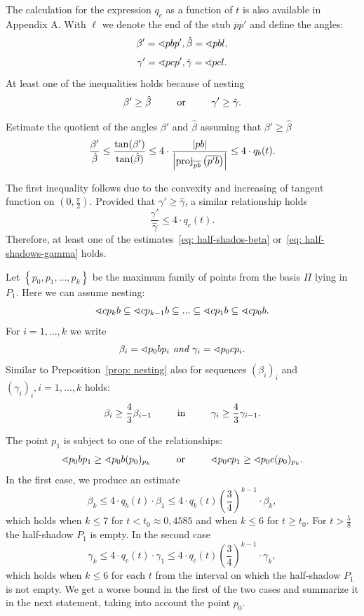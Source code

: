 The calculation for the expression $q_{c}$ as a function of $t$ is also available in Appendix A. With $\ell$ we denote the end of the stub $\overline{p}p'$ and define the angles:
$$
\beta' = \sphericalangle{pbp'}, \hat{\beta} = \sphericalangle{pbl},
$$
$$
\gamma' = \sphericalangle{pcp'}, \hat{\gamma} = \sphericalangle{pcl}.
$$
At least one of the inequalities holds because of nesting
$$
\beta' \geq \hat{\beta} \text{\hspace{0.8cm}   or   \hspace{0.8cm}} \gamma' \geq \hat{\gamma}.
$$

Estimate the quotient of the angles $\beta'$ and $\hat{\beta}$ assuming that $\beta' \geq \hat{\beta}$
\begin{equation}
\label{eq: half-shados-beta}
\frac{\beta'}{\hat{\beta}} \leq \frac{\tan(\beta')}{\tan(\hat{\beta})} \leq 4\cdot\frac{\left|pb\right|}{\left|\operatorname{proj}_{\overline{pb}} \left(\overline{p'b}\right) \right|} \leq 4 \cdot q_{b}(t).
\end{equation}

The first inequality follows due to the convexity and increasing of tangent function on $(0,\frac{\pi}{2})$. Provided that $\gamma' \geq \hat{\gamma}$, a similar relationship holds
\begin{equation}
\label{eq: half-shadows-gamma}
\frac{\gamma'}{\hat{\gamma}} \leq 4 \cdot q_{c}(t).
\end{equation}
Therefore, at least one of the estimates~\eqref{eq: half-shados-beta} or~\eqref{eq: half-shadows-gamma} holds.

Let $\left\{ p_{0},p_{1},..., p_{k} \right\}$ be the maximum family of points from the basis $\Pi$ lying in $P_{1}$. Here we can assume nesting:
$$
\sphericalangle{cp_{k}b} \subseteq \sphericalangle{cp_{k-1}b} \subseteq ... \subseteq \sphericalangle{cp_{1}b} \subseteq \sphericalangle{cp_{0}b}.
$$
For $i = 1, ..., k$ we write
$$
\beta_{i} = \sphericalangle{p_{0}bp_{i}} \textit{  and  } \gamma_{i} = \sphericalangle{p_{0}cp_{i}}.
$$
Similar to Preposition~\ref{prop: nesting} also for sequences $(\beta_{i})_{i}$ and $(\gamma_{i})_{i}, i = 1,...,k$ holds:
$$
\beta_{i} \geq \frac{4}{3}\beta_{i-1} \text{\hspace{0.8cm}   in   \hspace{0.8cm}} \gamma_{i} \geq \frac{4}{3} \gamma_{i-1}.
$$

The point $p_{1}$ is subject to one of the relationships:
$$
\sphericalangle{p_{0}bp_{1}} \geq  \sphericalangle{p_{0}b(p_{0})_{p_{k}}} \text{\hspace{0.8cm}   or   \hspace{0.8cm}} \sphericalangle{p_{0}cp_{1}} \geq \sphericalangle{p_{0}c(p_{0})_{p_{k}}}.
$$
In the first case, we produce an estimate
$$
\beta_{k} \leq 4 \cdot q_{b}(t) \cdot \beta_{1} \leq 4 \cdot q_{b}(t) \left(\frac{3}{4}\right)^{k-1} \cdot \beta_{k},
$$
which holds when $k \leq 7$ for $t < t_{0} \approx 0{,}4585$ and when $k \leq 6$ for $t \geq t_{0}$. For $t > \frac{5}{8}$ the half-shadow $P_{1}$ is empty. In the second case
$$
\gamma_{k} \leq 4 \cdot q_{c}(t) \cdot \gamma_{1} \leq 4 \cdot q_{c}(t) \left(\frac{3}{4}\right)^{k-1} \cdot \gamma_{k},
$$
which holds when $k \leq 6$ for each $t$ from the interval on which the half-shadow $P_{1}$ is not empty. We get a worse bound in the first of the two cases and summarize it in the next statement, taking into account the point $p_{0}$.

